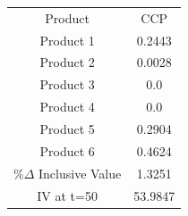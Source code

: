 \begin{tabular}{cc}
Product & CCP \\
Product 1 & 0.2443 \\
Product 2 & 0.0028 \\
Product 3 & 0.0 \\
Product 4 & 0.0 \\
Product 5 & 0.2904 \\
Product 6 & 0.4624 \\
$\%\Delta$ Inclusive Value & 1.3251 \\
IV at t=50 & 53.9847 \\
\end{tabular}